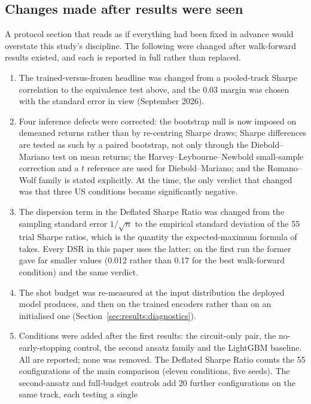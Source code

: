 \subsection{Changes made after results were seen}
\label{sec:protocol:changes}
A protocol section that reads as if everything had been fixed in advance would
overstate this study's discipline. The following were changed after
walk-forward results existed, and each is reported in full rather than
replaced.
\begin{enumerate}
  \item The trained-versus-frozen headline was changed from a pooled-track
    Sharpe correlation to the equivalence test above, and the \num{0.03} margin
    was chosen with the standard error in view (September 2026).
  \item Four inference defects were corrected: the bootstrap null is now imposed
    on demeaned returns rather than by re-centring Sharpe draws; Sharpe
    differences are tested as such by a paired bootstrap, not only through the
    Diebold--Mariano test on mean returns; the Harvey--Leybourne--Newbold
    small-sample correction and a $t$ reference are used for Diebold--Mariano;
    and the Romano--Wolf family is stated explicitly. At the time, the only
    verdict that changed was that three US conditions became significantly
    negative.
  \item The dispersion term in the Deflated Sharpe Ratio was changed from the
    sampling standard error $1/\sqrt{n}$ to the empirical standard deviation of
    the \num{55} trial Sharpe ratios, which is the quantity the expected-maximum
    formula of \citet{bailey2014deflated} takes. Every DSR in this paper uses the
    latter; on the first run the former gave far smaller values (\num{0.012}
    rather than \num{0.17} for the best walk-forward condition) and the same
    verdict.
  \item The shot budget was re-measured at the input distribution the deployed
    model produces, and then on the trained encoders rather than on an
    initialised one (Section~\ref{sec:results:diagnostics}).
  \item Conditions were added after the first results: the circuit-only pair,
    the no-early-stopping control, the second ansatz family and the LightGBM
    baseline. All are reported; none was removed. The Deflated Sharpe Ratio
    counts the \num{55} configurations of the main comparison (eleven
    conditions, five seeds). The second-ansatz and full-budget controls add
    \num{20} further configurations on the same track, each testing a single

\end{enumerate}
